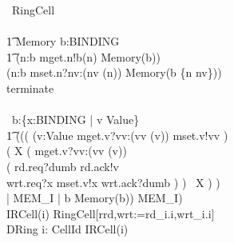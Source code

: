 \documentclass[10pt]{article}
\begin{document}
\begin{circus}
    \circprocess\ RingCell \circdef \\
    \circbegin\\
    \t1
        Memory \circdef 
            \circvres b:BINDING \circspot \\
            \t1
                (\Extchoice n:\dom b \circspot mget.n!b(n) \then Memory(b)) \\
                \extchoice (\Extchoice n:\dom b \circspot mset.n?nv:(nv \in \delta(n)) \then Memory(b \oplus \{n \mapsto nv\}))\\
                \extchoice terminate \then \Skip \\
        \\
        \circspot
            \circvar\ b:\{x:BINDING | v \in Value\} \circspot \\
            \t1
            ((( 
                        (\Intchoice v:Value \circspot mget.v?vv:(vv \in \delta(v)) \then mset.v!vv \then \Skip) \circseq \\
                            ( \circmu X \circspot
                                ( mget.v?vv:(vv \in \delta(v)) \then \\
                                    ( rd.req?dumb \then rd.ack!v \then \Skip \\
                                      \extchoice wrt.req?x \then mset.v!x 
                                                \then wrt.ack?dumb \then \Skip
                                    )
                                ) \circseq\ X
                            )
                        ) \\
                        \lpar {} | MEM\_I | { b } \rpar Memory(b))
                        \circhide MEM\_I)
    \circend
    \\
    \circprocess IRCell(i) \circdef RingCell[rrd,wrt:=rd\_i.i,wrt\_i.i]
    \\
    \circprocess DRing \circdef \Interleave i: CellId \circspot IRCell(i)
\end{circus}%
\end{document}
